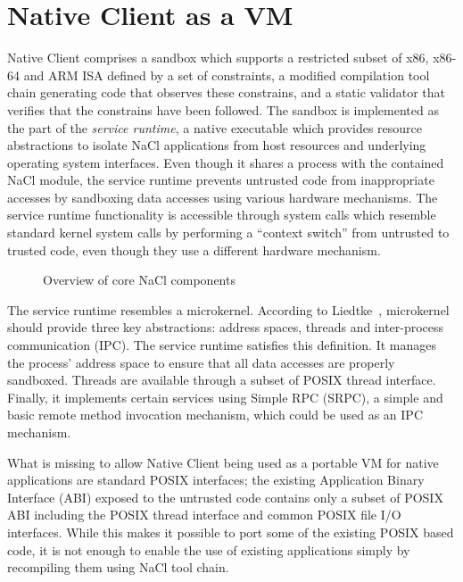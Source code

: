 \section{Native Client as a VM}
\label{sec:overview}

Native Client comprises a sandbox which supports a restricted
subset of x86, x86-64 and ARM ISA defined by a set of constraints, a
modified compilation tool chain generating code that observes these
constrains, and a static validator that verifies that the constrains
have been followed.  The sandbox is implemented as the part of the
\emph{service runtime}, a native executable which provides resource
abstractions to isolate NaCl applications from host resources and
underlying operating system interfaces. Even though it shares a process
with the contained NaCl module, the service runtime prevents untrusted
code from inappropriate accesses by sandboxing data accesses using
various hardware mechanisms. The service runtime functionality is
accessible through system calls which resemble standard kernel system
calls by performing a ``context switch'' from untrusted to trusted code,
even though they use a different hardware mechanism.


\begin{figure}
\centering
\caption{Overview of core NaCl components}
\label{fig:overview}
\end{figure}

The service runtime resembles a microkernel. According to
Liedtke~\cite{liedtke:sosp93}, microkernel should provide three key
abstractions: address spaces, threads and inter-process communication
(IPC). The service runtime satisfies this definition. It manages the
process' address space to ensure that all data accesses are properly
sandboxed.  Threads are available through a subset of POSIX thread
interface.  Finally, it implements certain services using Simple RPC
(SRPC), a simple and basic remote method invocation mechanism, which
could be used as an IPC mechanism.  

What is missing to allow Native Client being used as a portable VM for
native applications are standard POSIX interfaces; the existing
Application Binary Interface (ABI) exposed to the untrusted code
contains only a subset of POSIX ABI including the POSIX thread interface
and common POSIX file I/O interfaces. While this makes it possible to
port some of the existing POSIX based code, it is not enough to enable
the use of existing applications simply by recompiling them using NaCl
tool chain.

